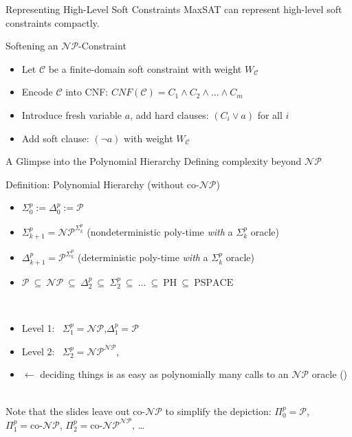 \documentclass[t,english]{sdqbeamer}
\begin{document}
\begin{frame}{Representing High-Level Soft Constraints}
MaxSAT can represent high-level soft constraints compactly.\\[1em]
\begin{block}{Softening an $\mathcal{NP}$-Constraint}
\begin{itemize}\itemsep1em
  \item Let $\mathcal{C}$ be a finite-domain soft constraint with weight $W_{\mathcal{C}}$
  \item Encode $\mathcal{C}$ into CNF: $CNF(\mathcal{C}) = C_1 \wedge C_2 \wedge \dots \wedge C_m$
  \item Introduce fresh variable $a$, add hard clauses: $(C_i \vee a)$ for all $i$
  \item Add soft clause: $(\lnot a)$ with weight $W_{\mathcal{C}}$
\end{itemize}
\end{block}
\end{frame}

\begin{frame}{A Glimpse into the Polynomial Hierarchy}
{Defining complexity beyond $\mathcal{NP}$}
\begin{blueblock}{Definition: Polynomial Hierarchy (without co-$\mathcal{NP}$)}
\begin{itemize}\itemsep1ex
	\item $\Sigma_0^p := \Delta_0^p := \mathcal{P}$
	\item $\Sigma_{k+1}^p = \mathcal{NP}^{\Sigma_k^p}$ \hfill (nondeterministic poly-time \emph{with} a $\Sigma_k^p$ oracle)
	\item $\Delta_{k+1}^p = \mathcal{P}^{\Sigma_k^p}$ \hfill (deterministic poly-time \emph{with} a $\Sigma_k^p$ oracle)
	\item $\mathcal{P} ~\subseteq~ \mathcal{NP} ~\subseteq~ \Delta_2^p ~\subseteq~ \Sigma_2^p ~\subseteq~ \dots ~\subseteq~ \mathrm{PH} ~\subseteq~ \mathrm{PSPACE}$
\end{itemize}
\end{blueblock}~\\
\begin{itemize}\itemsep1ex
	\item Level 1:~ $\Sigma_1^p = \mathcal{NP}$,\quad $\Delta_1^p = \mathcal{P}$
	\item Level 2:~ $\Sigma_2^p = \mathcal{NP}^{\mathcal{NP}}$,\quad {}
	\item {} $\longleftarrow$ deciding things is as easy as polynomially many calls to an $\mathcal{NP}$ oracle ()
\end{itemize}~\\[2em]
Note that the slides leave out co-$\mathcal{NP}$ to simplify the depiction: $\Pi_0^p = \mathcal{P}$, $\Pi_1^p = \text{co-}\mathcal{NP}$, $\Pi_2^p = \text{co-}\mathcal{NP}^{\mathcal{NP}}$, \dots
\end{frame}
\end{document}
